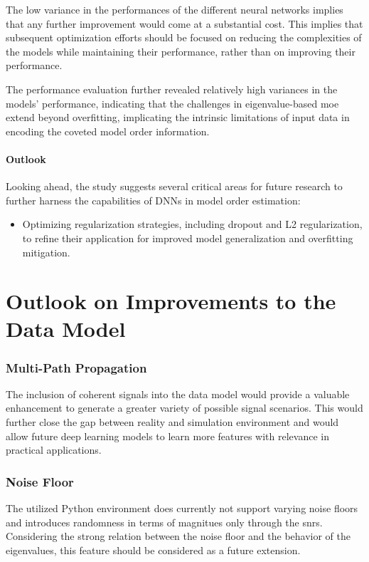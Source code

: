 The low variance in the performances of the different neural networks implies that any further improvement would come
at a substantial cost. This implies that subsequent optimization efforts should be focused on reducing the complexities
of the models while maintaining their performance, rather than on improving their performance.

The performance evaluation further revealed relatively high variances in the models' performance, indicating that the challenges
in eigenvalue-based \gls{moe} extend beyond overfitting, implicating the intrinsic limitations of input data in encoding
the coveted model order information.


\paragraph{Outlook}
Looking ahead, the study suggests several critical areas for future research to further harness the capabilities of DNNs
in model order estimation:
\begin{itemize}
    \item Optimizing regularization strategies, including dropout and L2 regularization, to refine their application for
    improved model generalization and overfitting mitigation.
\end{itemize}


\section{Outlook on Improvements to the Data Model}
\subsubsection{Multi-Path Propagation}
The inclusion of coherent signals into the data model would provide a valuable enhancement to generate a greater variety
of possible signal scenarios. This would further close the gap between reality and simulation environment and would allow
future deep learning models to learn more features with relevance in practical applications.

\subsubsection{Noise Floor}
The utilized Python environment does currently not support varying noise floors and introduces randomness in terms of magnitues
only through the \glspl{snr}. Considering the strong
relation between the noise floor and the behavior of the eigenvalues, this feature should be considered as a future extension.

